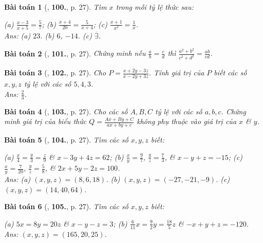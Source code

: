 \documentclass{article}
\newtheorem{baitoan}{Bài toán}
\begin{document}
\begin{baitoan}[\cite{Tuyen_Toan_7}, \textbf{100.}, p. 27]
	Tìm $x$ trong mỗi tỷ lệ thức sau:
	
		(a) $\frac{x - 3}{x + 5} = \frac{5}{7}$;
		(b) $\frac{x + 4}{20} = \frac{5}{x + 4}$;
		(c) $\frac{x + 1}{x^2} = \frac{1}{x}$.
	\\\mbox{}\hfill{\sf Ans:} (a) $23$. (b) $6$, $-14$. (c) $\overline{\exists}$.
\end{baitoan}

\begin{baitoan}[\cite{Tuyen_Toan_7}, \textbf{101.}, p. 27]
	Chứng minh nếu $\frac{a}{b} = \frac{c}{d}$ thì $\frac{a^2 + b^2}{c^2 + d^2} = \frac{ab}{cd}$.
\end{baitoan}

\begin{baitoan}[\cite{Tuyen_Toan_7}, \textbf{102.}, p. 27]
	Cho $P = \frac{x + 2y - 3z}{x - 2y + 3z}$. Tính giá trị của $P$ biết các số $x,y,z$ tỷ lệ với các số $5,4,3$.\\\mbox{}\hfill{\sf Ans:} $\frac{2}{3}$.
\end{baitoan}

\begin{baitoan}[\cite{Tuyen_Toan_7}, \textbf{103.}, p. 27]
	Cho các số $A,B,C$ tỷ lệ với các số $a,b,c$. Chứng minh giá trị của biểu thức $Q = \frac{Ax + By + C}{ax + by + c}$ không phụ thuộc vào giá trị của $x$ \& $y$.
\end{baitoan}

\begin{baitoan}[\cite{Tuyen_Toan_7}, \textbf{104.}, p. 27]
	Tìm các số $x,y,z$ biết:
	
		(a) $\frac{x}{4} = \frac{y}{3} = \frac{z}{9}$ \& $x - 3y + 4z = 62$;
		(b) $\frac{x}{y} = \frac{9}{7}$, $\frac{y}{z} = \frac{7}{3}$, \& $x - y + z = -15$;
		(c) $\frac{x}{y} = \frac{7}{20}$, $\frac{y}{z} = \frac{5}{8}$, \& $2x + 5y - 2z = 100$.
	\\\mbox{}\hfill{\sf Ans:} (a) $(x,y,z) = (8,6,18)$. (b) $(x,y,z) = (-27,-21,-9)$. (c) $(x,y,z) = (14,40,64)$.
\end{baitoan}

\begin{baitoan}[\cite{Tuyen_Toan_7}, \textbf{105.}, p. 27]
	Tìm các số $x,y,z$ biết:
	
		(a) $5x = 8y = 20z$ \& $x - y - z = 3$;
		(b) $\frac{6}{11}x = \frac{9}{2}y = \frac{18}{5}z$ \& $-x + y + z = -120$.
	\hfill{\sf Ans:} $(x,y,z) = (165,20,25)$.
\end{baitoan}
\end{document}
